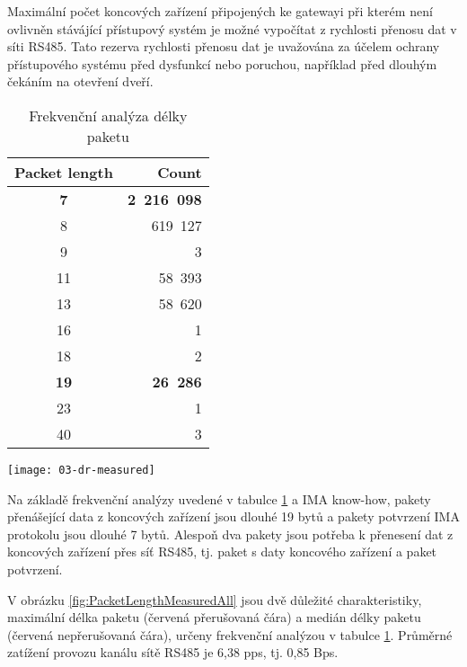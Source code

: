 Maximální počet koncových zařízení připojených ke gatewayi při kterém není ovlivněn stávájící přístupový systém je možné vypočítat z rychlosti přenosu dat v síti RS485. 
Tato rezerva rychlosti přenosu dat je uvažována za účelem ochrany přístupového systému před dysfunkcí nebo poruchou, například před dlouhým čekáním na otevření dveří.

\begin{table}[h]
\centering
\footnotesize
\caption{Frekvenční analýza délky paketu}
\begin{ctucolortab}
    \begin{tabular}{|c|r|}
        \hline
Packet length &  Count \\ \hline
\textbf{7}  &  \textbf{2~216~098}  \\
8  &   619~127   \\
9  &         3   \\
11 &    58~393   \\
13 &    58~620   \\
16 &         1   \\
18 &         2   \\
\textbf{19} &    \textbf{26~286}   \\
23 &         1   \\
40 &         3   \\
\hline
\end{tabular}
\end{ctucolortab}
\label{tab:FreqAnalysis}
\end{table}

\begin{figure*}[ht]
    \centering
    \texttt{[image: 03-dr-measured]}
    \caption{Měřená rychlost přenosu dat [bps] v síti RS485 během doby testování}
    \label{fig:PacketLengthMeasuredAll}
\end{figure*}

Na základě frekvenční analýzy uvedené v tabulce \ref{tab:FreqAnalysis} a IMA know-how, pakety přenášející data z koncových zařízení jsou dlouhé 19 bytů a pakety potvrzení IMA protokolu jsou dlouhé 7 bytů. Alespoň dva pakety jsou potřeba k přenesení dat z koncových zařízení přes síť RS485, tj. paket s daty koncového zařízení a paket potvrzení.

V obrázku \ref{fig:PacketLengthMeasuredAll} jsou dvě důležité charakteristiky, maximální délka paketu 
(červená přerušovaná čára) a medián délky paketu (červená nepřerušovaná čára), určeny frekvenční analýzou v tabulce \ref{tab:FreqAnalysis}. 
Průměrné zatížení provozu kanálu sítě RS485 je 6,38 pps, tj. 0,85 Bps.



